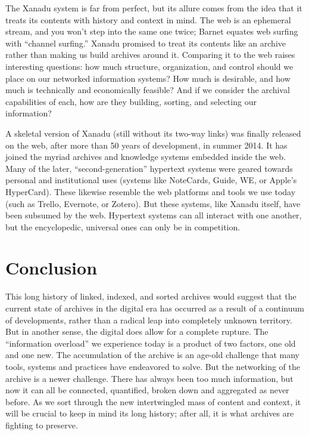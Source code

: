 The Xanadu system is far from perfect, but its allure comes from the idea that it treats its contents with history and context in mind. The web is an ephemeral stream, and you won’t step into the same one twice; Barnet equates web surfing with “channel surfing.”  Xanadu promised to treat its contents like an archive rather than making us build archives around it. Comparing it to the web raises interesting questions: how much structure, organization, and control should we place on our networked information systems? How much is desirable, and how much is technically and economically feasible? And if we consider the archival capabilities of each, how are they building, sorting, and selecting our information?

A skeletal version of Xanadu (still without its two-way links) was finally released on the web, after more than 50 years of development, in summer 2014.  It has joined the myriad archives and knowledge systems embedded inside the web. Many of the later, “second-generation” hypertext systems were geared towards personal and institutional uses (systems like NoteCards, Guide, WE, or Apple’s HyperCard). These likewise resemble the web platforms and tools we use today (such as Trello, Evernote, or Zotero).  But these systems, like Xanadu itself, have been subsumed by the web. Hypertext systems can all interact with one another, but the encyclopedic, universal ones can only be in competition.

\section{Conclusion}

This long history of linked, indexed, and sorted archives would suggest that the current state of archives in the digital era has occurred as a result of a continuum of developments, rather than a radical leap into completely unknown territory. But in another sense, the digital does allow for a complete rupture. The “information overload” we experience today is a product of two factors, one old and one new. The accumulation of the archive is an age-old challenge that many tools, systems and practices have endeavored to solve. But the networking of the archive is a newer challenge. There has always been too much information, but now it can all be connected, quantified, broken down and aggregated as never before. As we sort through the new intertwingled mass of content and context, it will be crucial to keep in mind its long history; after all, it is what archives are fighting to preserve.

